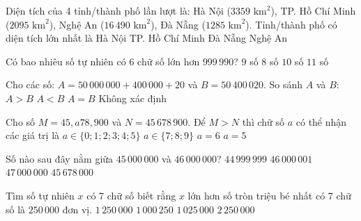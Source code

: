 \begin{ex} %
Diện tích của 4 tỉnh/thành phố lần lượt là: Hà Nội ($3359\text{ km}^2$), TP. Hồ Chí Minh ($2095\text{ km}^2$), Nghệ An ($16\,490\text{ km}^2$), Đà Nẵng ($1285\text{ km}^2$). Tỉnh/thành phố có diện tích lớn nhất là
\choice
{Hà Nội}
{TP. Hồ Chí Minh}
{Đà Nẵng}
{\True Nghệ An}
\end{ex}

\begin{ex} %
Có bao nhiêu số tự nhiên có 6 chữ số lớn hơn $999\,990$?
\choice
{\True $9$ số}
{$8$ số}
{$10$ số}
{$11$ số}
\end{ex}

\begin{ex} %
Cho các số: $A = 50\,000\,000 + 400\,000 + 20$ và $B = 50\,400\,020$. So sánh $A$ và $B$:
\choice
{$A > B$}
{$A < B$}
{\True $A = B$}
{Không xác định}
\end{ex}

\begin{ex} %
Cho số $M = 45,a78,900$ và $N = 45\,678\,900$. Để $M > N$ thì chữ số $a$ có thể nhận các giá trị là
\choice
{$a \in \{0; 1; 2; 3; 4; 5\}$}
{\True $a \in \{7; 8; 9\}$}
{$a = 6$}
{$a = 5$}
\end{ex}

\begin{ex} %
Số nào sau đây nằm giữa $45\,000\,000$ và $46\,000\,000$?
\choice
{$44\,999\,999$}
{$46\,000\,001$}
{$47\,000\,000$}
{\True $45\,678\,000$}
\end{ex}

\begin{ex} %
Tìm số tự nhiên $x$ có 7 chữ số biết rằng $x$ lớn hơn số tròn triệu bé nhất có 7 chữ số là $250\,000$ đơn vị.
\choice
{\True $1\,250\,000$}
{$1\,000\,250$}
{$1\,025\,000$}
{$2\,250\,000$}
\end{ex}

